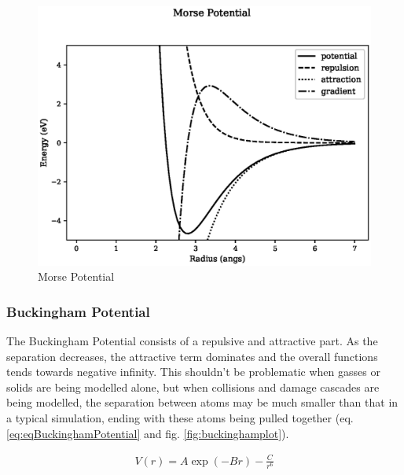 \begin{figure}[!htbp]
  \begin{center}
    \includegraphics[width=.6\linewidth]{chapters/interatomic_potential_fitting/plots_pair_potentials/morse.eps}
    \caption{Morse Potential}
    \label{graph:morsepot}
  \end{center}
\end{figure}



\FloatBarrier
\subsubsection{Buckingham Potential}
\label{section:Buckingham}

The Buckingham Potential consists of a repulsive and attractive part.  As the separation decreases, the attractive term dominates and the overall functions tends towards negative infinity.  This shouldn't be problematic when gasses or solids are being modelled alone, but when collisions and damage cascades are being modelled, the separation between atoms may be much smaller than that in a typical simulation, ending with these atoms being pulled together (eq. \ref{eq:eqBuckinghamPotential} and fig. \ref{fig:buckinghamplot}).

\begin{equation}
\begin{split}
V(r) = A \exp(-B  r) - \frac{C}{r^6}
\end{split}
\label{eq:eqBuckinghamPotential}
\end{equation}

